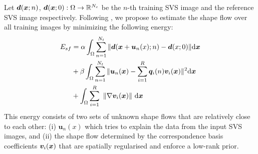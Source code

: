 %


Let $\bm{d}(\boldsymbol{x};n)$, $\bm{d}(\boldsymbol{x};0):\Omega\rightarrow \mathbb{R}^{N_c}$ be the $n$-th training SVS image and the reference SVS image respectively. Following \cite{Garg:2013hu}, we propose to estimate the shape flow over all training images by minimizing the following energy:
\vspace{-5pt}
\begin{align}
E_{sf} & =\alpha
\int_{\Omega}\sum_{n=1}^{N_t} \|\bm{d}(\bx+\bm{u}_n(x);n)-\bm{d}(x;0)\| \ud \bx \label{eq:costfunc}\\
    &+ \beta \int_{\Omega}\sum_{n=1}^{N_t}\|\bm{u}_n(\bx)-\sum_{i=1}^R\bm{q}_i(n)\bm{v}_i(\bx)\|^2 \ud \bx \label{eq:lowrank}\\
    &+
\int_\Omega  \sum_{i=1}^R \,\, \left \|    \nabla \bm{v}_i(\bx)    \right \|  \,\ud \bx \label{eq:TVterm}
\vspace{-5pt}
\end{align}
This energy consists of two sets of unknown shape flows that are relatively close to each other: (i) $\bm{u}_n(x)$ which tries to explain the data from the input SVS images, and (ii) the shape flow determined by the correspondence basis coefficients $\bm{v}_i(\boldsymbol{x})$ that are spatially regularised and enforce a low-rank prior.


